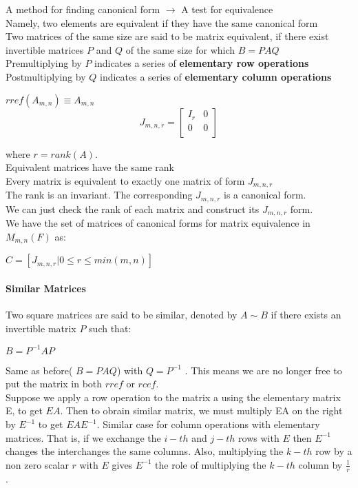 \documentclass[12pt]{article}
\let\to=\rightarrow
\begin{document}
A method for finding canonical form $\to$ A test for equivalence\\
Namely, two elements are equivalent if they have the same canonical form\\


Two matrices of the same size are said to be matrix equivalent, if there exist invertible matrices $P$ and $Q$ of the same size for which $B = PAQ$\\

Premultiplying by $P$ indicates a series of \textbf{elementary row operations}\\
Postmultiplying by $Q$ indicates a series of \textbf{elementary column operations}

$rref(A_{m,n}) \equiv A_{m,n}$\\

\[
J_{m,n,r} = \begin{bmatrix}
I_r & 0 \\
0 & 0 \\ 
\end{bmatrix}
\]

where $r = rank(A)$.\\

Equivalent matrices have the same rank\\

Every matrix is equivalent to exactly one matrix of form $J_{m,n,r}$\\

The rank is an invariant. The corresponding $J_{m,n,r}$ is a canonical form.\\

We can just check the rank of each matrix and construct its $J_{m,n,r}$ form.\\

We have the set of matrices of canonical forms for matrix equivalence in $M_{m,n} (F)$ as:

\(C = [J_{m,n,r} | 0 \leq r \leq min(m,n)]\)



\paragraph{Similar Matrices}

Two square matrices are said to be similar, denoted by $A \sim B$ if there exists an invertible matrix $P$ such that:

\( B = P^{-1} A P\)

Same as before( $B = PAQ$) with $Q =  P^{-1} $ . This means we are no longer free to put the matrix in both $rref$ or $rcef$.\\
\color{blue}
Suppose we apply a row operation to the matrix a using the elementary matrix E, to get $EA$. Then to obrain similar matrix, we must multiply EA on the right by $E^{-1}$ to get $EAE^{-1}$. Similar case for column operations with elementary matrices. That is, if we exchange the $i-th$ and $j-th$ rows with $E$ then $E^{-1}$ changes the interchanges the same columns. Also, multiplying the $k-th$ row by a non zero scalar $r$ with $E$ gives $E^{-1}$ the role of multiplying the $k-th$ column by $\frac{1}{r}$.
\color{black}
\end{document}
